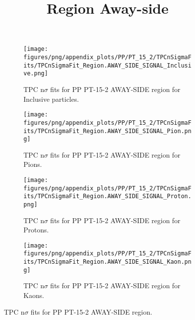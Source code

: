             \begin{figure}[H]
                \title{Region Away-side}
                \begin{subfigure}[b]{0.5\textwidth}
                    \centering
                    \texttt{[image: figures/png/appendix\_plots/PP/PT\_15\_2/TPCnSigmaFits/TPCnSigmaFit\_Region.AWAY\_SIDE\_SIGNAL\_Inclusive.png]}
                    \caption{TPC n$\sigma$ fits for PP PT-15-2 AWAY-SIDE region for Inclusive particles.}
                    \label{fig:appendix_PP_PT-15-2_AWAY_SIDE_SIGNAL_Inclusive}
                \end{subfigure}
                \begin{subfigure}[b]{0.5\textwidth}
                    \centering
                    \texttt{[image: figures/png/appendix\_plots/PP/PT\_15\_2/TPCnSigmaFits/TPCnSigmaFit\_Region.AWAY\_SIDE\_SIGNAL\_Pion.png]}
                    \caption{TPC n$\sigma$ fits for PP PT-15-2 AWAY-SIDE region for Pions.}
                    \label{fig:appendix_PP_PT-15-2_AWAY_SIDE_SIGNAL_Pion}
                \end{subfigure}
                \begin{subfigure}[b]{0.5\textwidth}
                    \centering
                    \texttt{[image: figures/png/appendix\_plots/PP/PT\_15\_2/TPCnSigmaFits/TPCnSigmaFit\_Region.AWAY\_SIDE\_SIGNAL\_Proton.png]}
                    \caption{TPC n$\sigma$ fits for PP PT-15-2 AWAY-SIDE region for Protons.}
                    \label{fig:appendix_PP_PT-15-2_AWAY_SIDE_SIGNAL_Proton}
                \end{subfigure}
                \begin{subfigure}[b]{0.5\textwidth}
                    \centering
                    \texttt{[image: figures/png/appendix\_plots/PP/PT\_15\_2/TPCnSigmaFits/TPCnSigmaFit\_Region.AWAY\_SIDE\_SIGNAL\_Kaon.png]}
                    \caption{TPC n$\sigma$ fits for PP PT-15-2 AWAY-SIDE region for Kaons.}
                    \label{fig:appendix_PP_PT-15-2_AWAY_SIDE_SIGNAL_Kaon}
                \end{subfigure}
                \caption{TPC n$\sigma$ fits for PP PT-15-2 AWAY-SIDE region.}
                \label{fig:appendix_PP_PT-15-2_AWAY_SIDE_SIGNAL}
            \end{figure}

